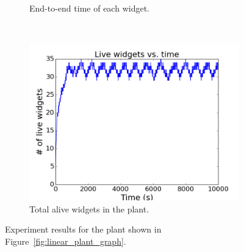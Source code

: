 \begin{figure}[!t]
\begin{subfigure}[t]{0.33\linewidth}
\caption{End-to-end time of each widget.}
\label{fig:linear_end_to_end}
    \end{subfigure}%
        ~ 
    \begin{subfigure}[t]{0.33\linewidth}
        \centering     
 \includegraphics[width=0.99\columnwidth]{Figures/b2-total-widgets}
\caption{Total alive widgets in the plant.}
\label{fig:linear_total_widgets}
    \end{subfigure}
    \caption{Experiment results for the plant shown in Figure~\ref{fig:linear_plant_graph}.}
    \label{fig:linear_model_exp}
\end{figure}



